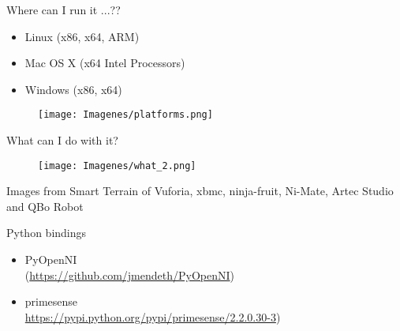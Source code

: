 \documentclass[bigger]{beamer}
\begin{document}
\begin{frame}{ Where can I run it ...??}
\begin{minipage}{0.47\textwidth}
\begin{itemize}
	\item Linux (x86, x64, ARM)
	\item Mac OS X (x64 Intel Processors)
	\item Windows (x86, x64)
\end{itemize}
\end{minipage}
\begin{minipage}{0.5\textwidth}
\begin{figure}[h]
		\texttt{[image: Imagenes/platforms.png]}
\end{figure}
\end{minipage}
\end{frame}


\begin{frame}{ What can I do with it?}

\begin{figure}[h]
		\texttt{[image: Imagenes/what\_2.png]}
\end{figure}
\tiny{Images from Smart Terrain \texttrademark of Vuforia\texttrademark, xbmc, ninja-fruit, Ni-Mate, Artec Studio\\ and QBo Robot}
\end{frame}

\begin{frame}[fragile]{ Python bindings}
\begin{itemize}
	\item PyOpenNI\\
    (\url{https://github.com/jmendeth/PyOpenNI})
	\item primesense \\ 
    \url{https://pypi.python.org/pypi/primesense/2.2.0.30-3})
\end{itemize}

\end{frame}
\end{document}

